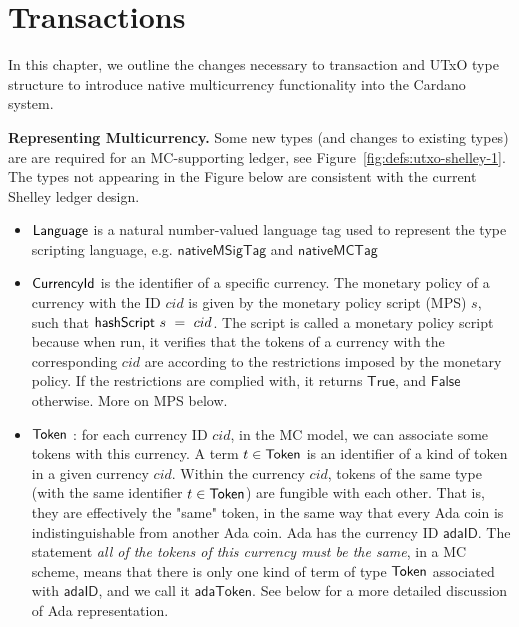 \section{Transactions}
\label{sec:transactions}

In this chapter, we outline the changes necessary to transaction and
UTxO type structure to introduce native multicurrency functionality
into the Cardano
system.

\textbf{Representing Multicurrency.}
Some new types (and changes to existing types) are are required for
an MC-supporting ledger, see Figure~\ref{fig:defs:utxo-shelley-1}.
The types not appearing in the Figure below are consistent with the
current Shelley ledger design.

\begin{itemize}

  \item $\mathsf{Language}$ is a natural number-valued language tag used to represent
  the type scripting language, e.g.
  $\mathsf{nativeMSigTag}$ and $\mathsf{nativeMCTag}$

  \item $\mathsf{CurrencyId}$ is the identifier of a specific currency. The monetary
  policy of a currency with the ID $cid$ is given by the monetary policy script
  (MPS) $s$, such that $\mathsf{hashScript}~s~=~cid$. The script is called a
  monetary policy script because when run, it verifies that the tokens of a currency
  with the corresponding $cid$ are according to the restrictions imposed by the
  monetary policy. If the restrictions are complied with, it returns
  $\mathsf{True}$, and
  $\mathsf{False}$ otherwise. More on MPS below.

  \item $\mathsf{Token}$ : for each currency ID $cid$, in the MC model, we can associate
  some tokens with this currency. A term $t\in\mathsf{Token}$ is an identifier of a
  kind of token in a given currency $cid$. Within the currency $cid$,
  tokens of the same type (with the same identifier $t\in\mathsf{Token}$) are fungible
  with each other. That is, they are effectively the "same" token, in the same way that
  every Ada coin is indistinguishable from another Ada coin. Ada
  has the currency ID $\mathsf{adaID}$. The statement \textit{all of the tokens
  of this currency must
  be the same}, in a MC scheme, means that there is only one kind of term of
  type $\mathsf{Token}$ associated
  with $\mathsf{adaID}$, and we call it $\mathsf{adaToken}$.
  See below for a more detailed discussion of Ada representation.


\end{itemize}
